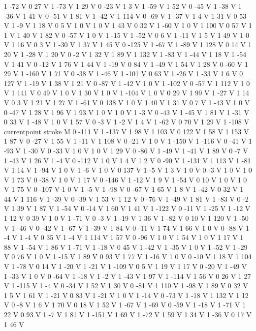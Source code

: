 {{1 -72 V
0 27 V
1 -73 V
1 29 V
0 -23 V
1 3 V
1 -59 V
1 52 V
0 -45 V
1 -38 V
1 -36 V
1 41 V
0 -51 V
1 81 V
1 -42 V
1 114 V
0 -69 V
1 -37 V
1 4 V
1 31 V
0 53 V
1 -9 V
1 18 V
0 5 V
1 0 V
1 0 V
1 43 V
0 32 V
1 -60 V
1 0 V
1 100 V
0 57 V
1 1 V
1 40 V
1 82 V
0 -57 V
1 0 V
1 -15 V
1 -52 V
0 6 V
1 -11 V
1 5 V
1 49 V
1 0 V
1 16 V
0 3 V
1 -30 V
1 37 V
1 45 V
0 -125 V
1 -67 V
1 -89 V
1 128 V
0 14 V
1 20 V
1 -28 V
1 20 V
0 -2 V
1 32 V
1 89 V
1 132 V
1 -83 V
1 -44 V
1 18 V
1 -54 V
1 41 V
0 -12 V
1 76 V
1 44 V
1 -19 V
0 84 V
1 -49 V
1 54 V
1 28 V
0 -60 V
1 29 V
1 -160 V
1 71 V
0 -38 V
1 -46 V
1 -101 V
0 63 V
1 -26 V
1 -33 V
1 6 V
0 127 V
1 -19 V
1 38 V
1 21 V
0 -87 V
1 -42 V
1 0 V
1 -102 V
0 -57 V
1 112 V
1 0 V
1 141 V
0 49 V
1 0 V
1 30 V
1 0 V
1 -104 V
1 0 V
0 29 V
1 99 V
1 -27 V
1 14 V
0 3 V
1 21 V
1 27 V
1 -61 V
0 138 V
1 0 V
1 40 V
1 31 V
0 7 V
1 -43 V
1 0 V
0 -47 V
1 28 V
1 96 V
1 93 V
1 0 V
1 0 V
1 -3 V
0 -43 V
1 -45 V
1 81 V
1 -31 V
0 33 V
1 -48 V
1 0 V
1 57 V
0 -3 V
1 -2 V
1 4 V
1 -62 V
0 70 V
1 29 V
1 -108 V
currentpoint stroke M
0 -111 V
1 -137 V
1 98 V
1 103 V
0 122 V
1 58 V
1 153 V
1 87 V
0 -27 V
1 55 V
1 -11 V
1 108 V
0 -21 V
1 0 V
1 -150 V
1 -116 V
0 -41 V
1 -93 V
1 -30 V
0 -33 V
1 0 V
1 0 V
1 29 V
0 -86 V
1 -49 V
1 -41 V
1 89 V
0 -7 V
1 -43 V
1 26 V
1 -4 V
0 -112 V
1 0 V
1 4 V
1 2 V
0 -90 V
1 -131 V
1 113 V
1 -81 V
1 14 V
1 -94 V
1 0 V
1 -6 V
1 0 V
0 137 V
1 -5 V
1 3 V
1 0 V
0 -3 V
1 0 V
1 0 V
1 73 V
0 -38 V
1 0 V
1 17 V
0 -146 V
1 -12 V
1 9 V
1 -54 V
0 10 V
1 0 V
1 0 V
1 75 V
0 -107 V
1 0 V
1 -5 V
1 -98 V
0 -67 V
1 65 V
1 8 V
1 -42 V
0 32 V
1 44 V
1 116 V
1 -39 V
0 -39 V
1 53 V
1 12 V
0 -76 V
1 -49 V
1 81 V
1 -83 V
0 -2 V
1 39 V
1 87 V
1 -54 V
0 -14 V
1 60 V
1 41 V
1 -122 V
0 -11 V
1 -25 V
1 -12 V
1 12 V
0 39 V
1 0 V
1 -71 V
0 -3 V
1 -19 V
1 36 V
1 -82 V
0 10 V
1 120 V
1 -50 V
1 -46 V
0 -42 V
1 -67 V
1 -39 V
1 84 V
0 -11 V
1 74 V
1 66 V
1 0 V
0 -88 V
1 -4 V
1 -4 V
0 35 V
1 -4 V
1 114 V
1 57 V
0 -96 V
1 0 V
1 54 V
1 0 V
1 17 V
1 88 V
1 -54 V
1 86 V
1 -71 V
1 -18 V
0 45 V
1 -42 V
1 -35 V
1 0 V
1 -52 V
1 -29 V
0 76 V
1 0 V
1 -15 V
1 89 V
0 93 V
1 77 V
1 -16 V
1 0 V
0 -10 V
1 18 V
1 104 V
1 -78 V
0 14 V
1 -20 V
1 -21 V
1 -109 V
0 5 V
1 19 V
1 17 V
0 -20 V
1 -49 V
1 -33 V
1 0 V
0 -64 V
1 -18 V
1 -2 V
1 -43 V
1 97 V
1 -114 V
1 56 V
0 26 V
1 27 V
1 -115 V
1 -4 V
0 -34 V
1 52 V
1 30 V
0 -81 V
1 110 V
1 -98 V
1 89 V
0 32 V
1 5 V
1 61 V
1 -21 V
0 83 V
1 -21 V
1 0 V
1 -14 V
0 -73 V
1 -18 V
1 132 V
1 12 V
0 -8 V
1 6 V
1 70 V
0 18 V
1 52 V
1 -67 V
1 -69 V
0 -59 V
1 -18 V
1 -71 V
1 22 V
0 93 V
1 -7 V
1 81 V
1 -151 V
1 69 V
1 -72 V
1 59 V
1 34 V
1 -36 V
0 17 V
1 46 V
}}

